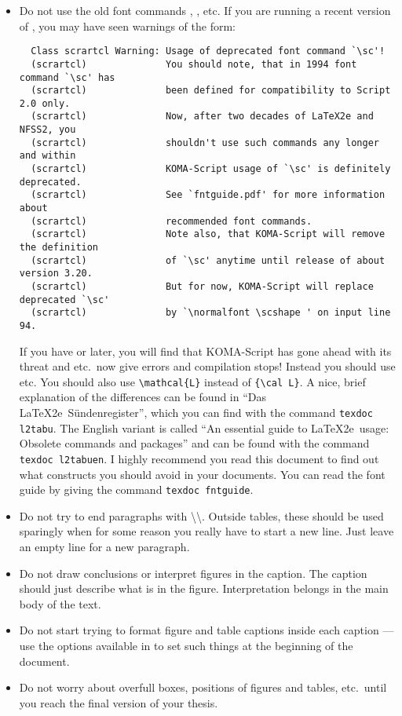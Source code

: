 \begin{itemize}
\item Do not use the old font commands , ,  etc.
  If you are running a recent version of \TeXLive, you may have seen warnings of the form:
  \begin{verbatim}
  Class scrartcl Warning: Usage of deprecated font command `\sc'!
  (scrartcl)              You should note, that in 1994 font command `\sc' has
  (scrartcl)              been defined for compatibility to Script 2.0 only.
  (scrartcl)              Now, after two decades of LaTeX2e and NFSS2, you
  (scrartcl)              shouldn't use such commands any longer and within
  (scrartcl)              KOMA-Script usage of `\sc' is definitely deprecated.
  (scrartcl)              See `fntguide.pdf' for more information about
  (scrartcl)              recommended font commands.
  (scrartcl)              Note also, that KOMA-Script will remove the definition
  (scrartcl)              of `\sc' anytime until release of about version 3.20.
  (scrartcl)              But for now, KOMA-Script will replace deprecated `\sc'
  (scrartcl)              by `\normalfont \scshape ' on input line 94.
  \end{verbatim}
  If you have  or later, you will find that KOMA-Script has gone ahead with its threat
  and  etc.\ now give errors and compilation stops!
  Instead you should use  etc.
  You should also use \verb|\mathcal{L}| instead of \verb|{\cal L}|.
  A nice, brief explanation of the differences can be found in \foreignlanguage{ngerman}{\enquote{Das \LaTeX2e\ Sündenregister}},
  which you can find with the command \texttt{texdoc l2tabu}.
  The English variant is called \enquote{An essential guide to \LaTeX2e\ usage: Obsolete commands and packages}
  and can be found with the command \texttt{texdoc l2tabuen}.
  I highly recommend you read this document to find out what constructs you should avoid in your documents.
  You can read the font guide by giving the command \texttt{texdoc fntguide}.

\item Do not try to end paragraphs with
  \textbackslash\textbackslash. 
  Outside tables, these should be used sparingly when
  for some reason you really have to start a new line.
  Just leave an empty line for a new paragraph.

\item Do not draw conclusions or interpret figures in the caption. The
  caption should just describe what is in the figure. Interpretation
  belongs in the main body of the text.

\item Do not start trying to format figure and table captions inside
  each caption --- use the options available in \KOMAScript{} to set
  such things at the beginning of the document.

\item Do not worry about overfull boxes, positions of figures
  and tables, etc.\ until you reach the final version of your thesis.
\end{itemize}


